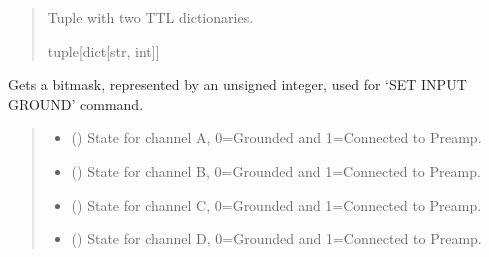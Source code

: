 \documentclass[letterpaper,10pt,english]{sphinxmanual}
\begin{document}
\begin{fulllineitems}
\begin{fulllineitems}
\begin{quote}
\begin{description}
\sphinxAtStartPar
Tuple with two TTL dictionaries.

\sphinxAtStartPar
tuple{[}dict{[}str, int{]}{]}

\end{description}\end{quote}

\end{fulllineitems}


\begin{fulllineitems}
\label{\detokenize{PodApi.Devices:PodApi.Devices.PodDevice_8401HR.Pod8401HR.GetChannelBitmask}}
\pysigstartsignatures
{}
\pysigstopsignatures
\sphinxAtStartPar
Gets a bitmask, represented by an unsigned integer, used for ‘SET INPUT GROUND’ command.
\begin{quote}\begin{description}
\begin{itemize}
\item {} 
\sphinxAtStartPar
{} () \textendash{} State for channel A, 0=Grounded and 1=Connected to Preamp.

\item {} 
\sphinxAtStartPar
{} () \textendash{} State for channel B, 0=Grounded and 1=Connected to Preamp.

\item {} 
\sphinxAtStartPar
{} () \textendash{} State for channel C, 0=Grounded and 1=Connected to Preamp.

\item {} 
\sphinxAtStartPar
{} () \textendash{} State for channel D, 0=Grounded and 1=Connected to Preamp.


\end{itemize}
\end{description}
\end{quote}
\end{fulllineitems}
\end{fulllineitems}
\end{document}
